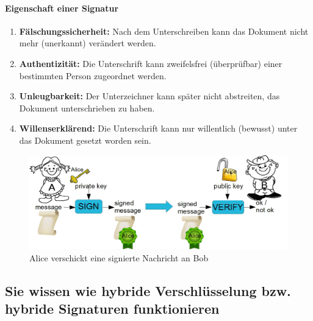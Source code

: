 \documentclass[10pt,a4paper]{article}
\begin{document}
\paragraph*{Eigenschaft einer Signatur}
\begin{enumerate}[noitemsep,topsep=0pt,leftmargin=*]
    \item \textbf{Fälschungssicherheit:} Nach dem Unterschreiben kann das Dokument nicht mehr (unerkannt) verändert werden.
    \item \textbf{Authentizität:} Die Unterschrift kann zweifelsfrei (überprüfbar) einer bestimmten Person zugeordnet werden.
    \item \textbf{Unleugbarkeit:} Der Unterzeichner kann später nicht abstreiten, das Dokument unterschrieben zu haben.
    \item \textbf{Willenserklärend:} Die Unterschrift kann nur willentlich (bewusst) unter das Dokument gesetzt worden sein.
\end{enumerate}
\begin{figure}[H]
    \begin{center}
    \includegraphics[width=12cm]{images/digisignatur0.png}
    \caption{Alice verschickt eine signierte Nachricht an Bob}
    \label{digisig0}
    \end{center}
\end{figure}


\subsection*{Sie wissen wie hybride Verschlüsselung bzw. hybride Signaturen funktionieren}
\end{document}
